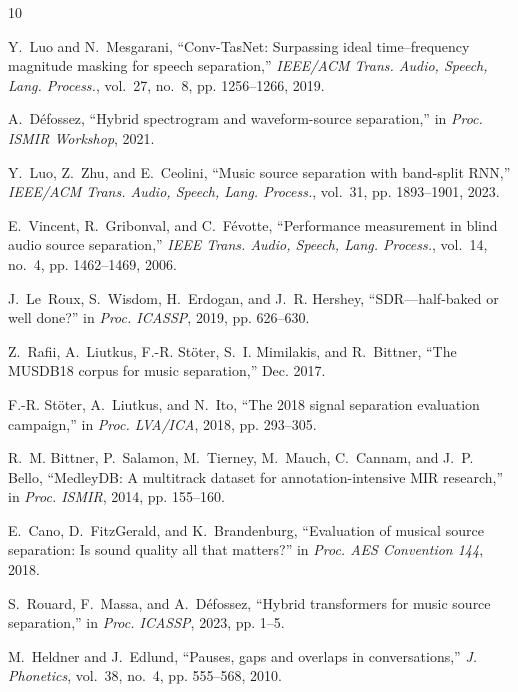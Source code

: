 \documentclass[10pt,journal,compsoc]{IEEEtran}
\begin{document}
\balance

\begin{thebibliography}{10}

Y.~Luo and N.~Mesgarani, ``Conv-TasNet: Surpassing ideal time--frequency magnitude masking for speech separation,'' \emph{IEEE/ACM Trans. Audio, Speech, Lang. Process.}, vol.~27, no.~8, pp. 1256--1266, 2019.

A.~D{\'e}fossez, ``Hybrid spectrogram and waveform-source separation,'' in \emph{Proc. ISMIR Workshop}, 2021.

Y.~Luo, Z.~Zhu, and E.~Ceolini, ``Music source separation with band-split RNN,'' \emph{IEEE/ACM Trans. Audio, Speech, Lang. Process.}, vol.~31, pp. 1893--1901, 2023.

E.~Vincent, R.~Gribonval, and C.~F{\'e}votte, ``Performance measurement in blind audio source separation,'' \emph{IEEE Trans. Audio, Speech, Lang. Process.}, vol.~14, no.~4, pp. 1462--1469, 2006.

J.~Le~Roux, S.~Wisdom, H.~Erdogan, and J.~R. Hershey, ``SDR---half-baked or well done?'' in \emph{Proc. ICASSP}, 2019, pp. 626--630.

Z.~Rafii, A.~Liutkus, F.-R. St{\"o}ter, S.~I. Mimilakis, and R.~Bittner, ``The MUSDB18 corpus for music separation,'' Dec. 2017.

F.-R. St{\"o}ter, A.~Liutkus, and N.~Ito, ``The 2018 signal separation evaluation campaign,'' in \emph{Proc. LVA/ICA}, 2018, pp. 293--305.

R.~M. Bittner, P.~Salamon, M.~Tierney, M.~Mauch, C.~Cannam, and J.~P. Bello, ``MedleyDB: A multitrack dataset for annotation-intensive MIR research,'' in \emph{Proc. ISMIR}, 2014, pp. 155--160.

E.~Cano, D.~FitzGerald, and K.~Brandenburg, ``Evaluation of musical source separation: Is sound quality all that matters?'' in \emph{Proc. AES Convention 144}, 2018.

S.~Rouard, F.~Massa, and A.~D{\'e}fossez, ``Hybrid transformers for music source separation,'' in \emph{Proc. ICASSP}, 2023, pp. 1--5.

M.~Heldner and J.~Edlund, ``Pauses, gaps and overlaps in conversations,'' \emph{J. Phonetics}, vol.~38, no.~4, pp. 555--568, 2010.


\end{thebibliography}
\end{document}

